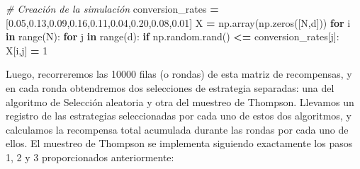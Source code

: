 \documentclass[
]{book}
\newenvironment{Shaded}{\begin{snugshade}}{\end{snugshade}}
\newcommand{\BuiltInTok}[1]{#1}
\newcommand{\CommentTok}[1]{\textcolor[rgb]{0.56,0.35,0.01}{\textit{#1}}}
\newcommand{\ControlFlowTok}[1]{\textcolor[rgb]{0.13,0.29,0.53}{\textbf{#1}}}
\newcommand{\DecValTok}[1]{\textcolor[rgb]{0.00,0.00,0.81}{#1}}
\newcommand{\FloatTok}[1]{\textcolor[rgb]{0.00,0.00,0.81}{#1}}
\newcommand{\KeywordTok}[1]{\textcolor[rgb]{0.13,0.29,0.53}{\textbf{#1}}}
\newcommand{\NormalTok}[1]{#1}
\newcommand{\OperatorTok}[1]{\textcolor[rgb]{0.81,0.36,0.00}{\textbf{#1}}}
\begin{document}
\begin{Shaded}
\begin{Highlighting}[]
\CommentTok{\# Creación de la simulación}
\NormalTok{conversion\_rates }\OperatorTok{=}\NormalTok{ [}\FloatTok{0.05}\NormalTok{,}\FloatTok{0.13}\NormalTok{,}\FloatTok{0.09}\NormalTok{,}\FloatTok{0.16}\NormalTok{,}\FloatTok{0.11}\NormalTok{,}\FloatTok{0.04}\NormalTok{,}\FloatTok{0.20}\NormalTok{,}\FloatTok{0.08}\NormalTok{,}\FloatTok{0.01}\NormalTok{]}
\NormalTok{X }\OperatorTok{=}\NormalTok{ np.array(np.zeros([N,d]))}
\ControlFlowTok{for}\NormalTok{ i }\KeywordTok{in} \BuiltInTok{range}\NormalTok{(N):}
    \ControlFlowTok{for}\NormalTok{ j }\KeywordTok{in} \BuiltInTok{range}\NormalTok{(d):}
        \ControlFlowTok{if}\NormalTok{ np.random.rand() }\OperatorTok{\textless{}=}\NormalTok{ conversion\_rates[j]:}
\NormalTok{            X[i,j] }\OperatorTok{=} \DecValTok{1}
\end{Highlighting}
\end{Shaded}

Luego, recorreremos las 10000 filas (o rondas) de esta matriz de recompensas, y en cada ronda obtendremos dos selecciones de estrategia separadas: una del algoritmo de Selección aleatoria y otra del muestreo de Thompson. Llevamos un registro de las estrategias seleccionadas por cada uno de estos dos algoritmos, y calculamos la recompensa total acumulada durante las rondas por cada uno de ellos. El muestreo de Thompson se implementa siguiendo exactamente los pasos 1, 2 y 3 proporcionados anteriormente:
\end{document}
